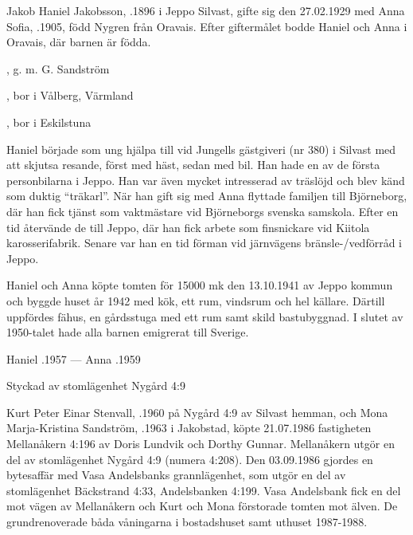 %
Jakob Haniel Jakobsson, .1896 i Jeppo Silvast, gifte sig den 27.02.1929 med Anna Sofia, .1905, född Nygren från Oravais. Efter giftermålet bodde Haniel och Anna i Oravais, där barnen är födda.
\begin{jhchildren}
  \item {}, g. m. G. Sandström
  \item {}
  \item {}, bor i Vålberg, Värmland
  \item {}, bor i Eskilstuna
\end{jhchildren}
Haniel började som ung hjälpa till vid Jungells gästgiveri (nr 380) i Silvast med att skjutsa resande, först med häst, sedan med bil. Han hade en av de första personbilarna i Jeppo. Han var även mycket intresserad av träslöjd och blev känd som duktig ``träkarl''. När han gift sig med Anna flyttade familjen till Björneborg, där han fick tjänst som vaktmästare vid Björneborgs svenska samskola. Efter en tid återvände de till Jeppo, där han fick arbete som finsnickare vid Kiitola karosserifabrik. Senare var han en tid förman vid järnvägens bränsle-/vedförråd i Jeppo.

Haniel och Anna köpte tomten för 15000 mk den 13.10.1941 av Jeppo kommun och byggde huset år 1942 med kök, ett rum, vindsrum och hel källare. Därtill uppfördes fähus, en gårdsstuga med ett rum samt skild bastubyggnad. I slutet av 1950-talet hade alla barnen emigrerat till Sverige.

Haniel .1957  ---  Anna .1959



%

Styckad av stomlägenhet Nygård 4:9


%
Kurt Peter Einar Stenvall, .1960 på Nygård 4:9 av Silvast hemman, och Mona Marja-Kristina Sandström, .1963 i 	Jakobstad, köpte 21.07.1986 fastigheten Mellanåkern 4:196 av Doris Lundvik och Dorthy Gunnar. Mellanåkern utgör en del av	stomlägenhet Nygård 4:9 (numera 4:208). Den 03.09.1986 gjordes en bytesaffär med Vasa Andelsbanks grannlägenhet, som utgör en del av stomlägenhet Bäckstrand 4:33, Andelsbanken 4:199. Vasa Andelsbank fick en del mot vägen av Mellanåkern och Kurt och Mona förstorade	tomten mot älven. De grundrenoverade båda våningarna i	bostadshuset samt uthuset 1987-1988.

